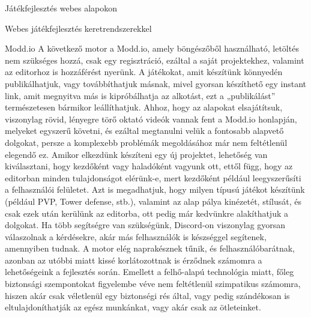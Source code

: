 \begin{MyChapter}{Játékfejlesztés webes alapokon}
\begin{MySection}{Webes játékfejlesztés keretrendszerekkel}
		\begin{MySubSection}{Modd.io}
			A következő motor a Modd.io, amely böngészőből használható, letöltés nem szükséges hozzá, csak egy regisztráció, ezáltal a saját projektekhez, valamint az editorhoz is hozzáférést nyerünk. A játékokat, amit készítünk könnyedén publikálhatjuk, vagy továbbíthatjuk másnak, mivel gyorsan készíthető egy instant link, amit megnyitva más is kipróbálhatja az alkotást, ezt a „publikálást” természetesen bármikor leállíthatjuk. Ahhoz, hogy az alapokat elsajátítsuk, viszonylag rövid, lényegre törő oktató videók vannak fent a Modd.io honlapján, melyeket egyszerű követni, és ezáltal megtanulni velük a fontosabb alapvető dolgokat, persze a komplexebb problémák megoldásához már nem feltétlenül elegendő ez. Amikor elkezdünk készíteni egy új projektet, lehetőség van kiválasztani, hogy kezdőként vagy haladóként vagyunk ott, ettől függ, hogy az editorban minden tulajdonságot elérünk-e, mert kezdőként például leegyszerűsíti a felhasználói felületet. Azt is megadhatjuk, hogy milyen típusú játékot készítünk (például PVP, Tower defense, stb.), valamint az alap pálya kinézetét, stílusát, és csak ezek után kerülünk az editorba, ott pedig már kedvünkre alakíthatjuk a dolgokat.
			\cite{modd.io_official_website}
			Ha több segítségre van szükségünk, Discord-on viszonylag gyorsan válaszolnak a kérdésekre, akár más felhasználók is készséggel segítenek, amennyiben tudnak.
			A motor elég naprakésznek tűnik, és felhasználóbarátnak, azonban az utóbbi miatt kissé korlátozottnak is érződnek számomra a lehetőségeink a fejlesztés során.
			Emellett a felhő-alapú technológia miatt, főleg biztonsági szempontokat figyelembe véve nem feltétlenül szimpatikus számomra, hiszen akár csak véletlenül egy biztonségi rés által, vagy pedig szándékosan is eltulajdoníthatják az egész munkánkat, vagy akár csak az ötleteinket.
		\end{MySubSection}
	

\end{MySection}
\end{MyChapter}
